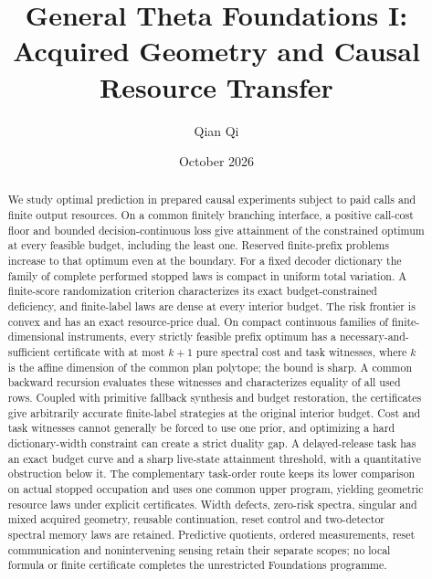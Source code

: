 
\title[Acquired geometry and causal resource transfer]{General Theta Foundations I:\\Acquired Geometry and Causal Resource Transfer}
\author{Qian Qi}\date{October 2026}

\begin{abstract}
We study optimal prediction in prepared causal experiments subject to paid calls and finite output resources. On a common finitely branching interface, a positive call-cost floor and bounded decision-continuous loss give attainment of the constrained optimum at every feasible budget, including the least one. Reserved finite-prefix problems increase to that optimum even at the boundary. For a fixed decoder dictionary the family of complete performed stopped laws is compact in uniform total variation. A finite-score randomization criterion characterizes its exact budget-constrained deficiency, and finite-label laws are dense at every interior budget. The risk frontier is convex and has an exact resource-price dual. On compact continuous families of finite-dimensional instruments, every strictly feasible prefix optimum has a necessary-and-sufficient certificate with at most $k+1$ pure spectral cost and task witnesses, where $k$ is the affine dimension of the common plan polytope; the bound is sharp. A common backward recursion evaluates these witnesses and characterizes equality of all used rows. Coupled with primitive fallback synthesis and budget restoration, the certificates give arbitrarily accurate finite-label strategies at the original interior budget. Cost and task witnesses cannot generally be forced to use one prior, and optimizing a hard dictionary-width constraint can create a strict duality gap. A delayed-release task has an exact budget curve and a sharp live-state attainment threshold, with a quantitative obstruction below it. The complementary task-order route keeps its lower comparison on actual stopped occupation and uses one common upper program, yielding geometric resource laws under explicit certificates. Width defects, zero-risk spectra, singular and mixed acquired geometry, reusable continuation, reset control and two-detector spectral memory laws are retained. Predictive quotients, ordered measurements, reset communication and nonintervening sensing retain their separate scopes; no local formula or finite certificate completes the unrestricted Foundations programme.
\end{abstract}
